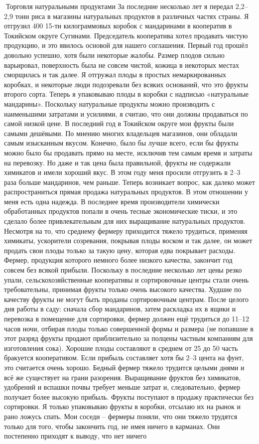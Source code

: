 \documentclass[a4paper]{book}
\begin{document}
Торговля натуральными продуктами
За последние несколько лет я передал 2,2–2,9 тонн риса в магазины натуральных
продуктов в различных частях страны. Я отгрузил 400 15‑ти килограммовых коробок с
мандаринами в кооператив в Токийском округе Сугинами. Председатель кооператива хотел
продавать чистую продукцию, и это явилось основой для нашего соглашения. Первый год
прошёл довольно успешно, хотя были некоторые жалобы. Размер плодов сильно варьировал,
поверхность была не совсем чистой, кожица в некоторых местах сморщилась и так далее. Я
отгружал плоды в простых немаркированных коробках, и некоторые люди подозревали без
всяких оснований, что это фрукты второго сорта. Теперь я упаковываю плоды в коробки с
надписью «натуральные мандарины».
Поскольку натуральные продукты можно производить с наименьшими затратами и
усилиями, я считаю, что они должны продаваться по самой низкой цене. В последний год в
Токийском округе мои фрукты были самыми дешёвыми. По мнению многих владельцев
магазинов, они обладали самым изысканным вкусом. Конечно, было бы лучше всего, если бы
фрукты можно было бы продавать прямо на месте, исключив тем самым время и затраты на
перевозку. Но даже и так цена была правильной, фрукты не содержали химикатов и имели
хороший вкус. В этом году меня просили отгрузить в 2–3 раза больше мандаринов, чем
раньше.
Теперь возникает вопрос, как далеко может распространиться прямая продажа
натуральных продуктов. В этом отношении у меня есть одна надежда. В последнее время
производители химически обработанных продуктов попали в очень тесные экономические
тиски, и это сделало более привлекательным для них выращивание натуральных продуктов.
Несмотря на то, что среднему фермеру приходится тяжело трудиться, применяя химикаты,
ускорители созревания, покрывая плоды воском и так далее, он может продать свои плоды
только за такую цену, которая едва покрывает расходы. Фермер, продукция которого немного
более низкого качества, закончит год совсем без всякой прибыли.
Поскольку в последние несколько лет цены резко упали, сельскохозяйственные
кооперативы и сортировочные центры стали очень требовательны, принимая фрукты только
очень высокого качества. Худшие по качеству фрукты не могут быть проданы сортировочным
центрам. После целого дня работы в саду: сначала сбор мандаринов, затем раскладка их в
ящики и перевозка в помещение для сортировки, фермер должен ещё трудиться до 11–12
часов ночи, отбирая плоды только совершенной формы и размера (не попавшие в этот разряд
фрукты продают приблизительно за полцены частным компаниям для изготовления сока).
Хорошие плоды составляют в среднем от 25 до 50 %
часть бракуется кооперативом. Если прибыль составляет хотя бы 2–3 цента на фунт, это
считается очень хорошо. Бедный фермер тяжело трудится целыми днями и всё же существует
на грани разорения.
Выращивание фруктов без химикатов, удобрений и вспашки почвы требует меньше
затрат и, следовательно, фермер получает более высокую прибыль. Фрукты поступают в
продажу практически без сортировки. Я только упаковываю фрукты в коробки, отсылаю их
на рынок и рано ложусь спать.
Мои соседи – фермеры поняли, что они тяжело трудятся только для того, чтобы
закончить год, не имея ничего в карманах. Они постепенно приходят к выводу, что нет ничего
\end{document}
